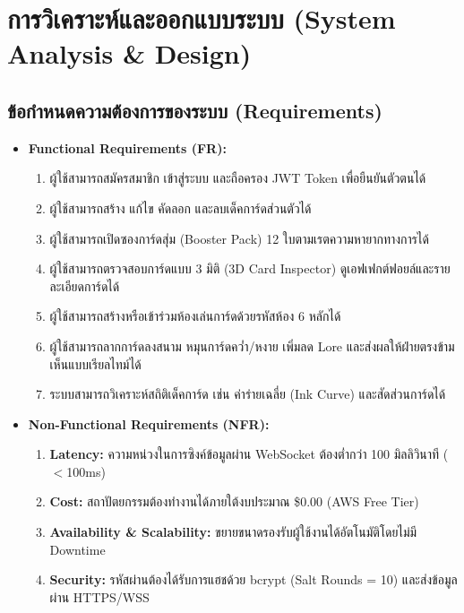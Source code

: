 \documentclass[12pt,a4paper]{article}
\begin{document}
\newpage

\section{การวิเคราะห์และออกแบบระบบ (System Analysis \& Design)}

\subsection{ข้อกำหนดความต้องการของระบบ (Requirements)}
\begin{itemize}[leftmargin=1.5em, itemsep=2pt]
  \item \textbf{Functional Requirements (FR):}
  \begin{enumerate}[leftmargin=1.5em, itemsep=1pt]
    \item ผู้ใช้สามารถสมัครสมาชิก เข้าสู่ระบบ และถือครอง JWT Token เพื่อยืนยันตัวตนได้
    \item ผู้ใช้สามารถสร้าง แก้ไข คัดลอก และลบเด็คการ์ดส่วนตัวได้
    \item ผู้ใช้สามารถเปิดซองการ์ดสุ่ม (Booster Pack) 12 ใบตามเรตความหายากทางการได้
    \item ผู้ใช้สามารถตรวจสอบการ์ดแบบ 3 มิติ (3D Card Inspector) ดูเอฟเฟกต์ฟอยล์และรายละเอียดการ์ดได้
    \item ผู้ใช้สามารถสร้างหรือเข้าร่วมห้องเล่นการ์ดด้วยรหัสห้อง 6 หลักได้
    \item ผู้ใช้สามารถลากการ์ดลงสนาม หมุนการ์ดคว่ำ/หงาย เพิ่มลด Lore และส่งผลให้ฝ่ายตรงข้ามเห็นแบบเรียลไทม์ได้
    \item ระบบสามารถวิเคราะห์สถิติเด็คการ์ด เช่น ค่าร่ายเฉลี่ย (Ink Curve) และสัดส่วนการ์ดได้
  \end{enumerate}
  \item \textbf{Non-Functional Requirements (NFR):}
  \begin{enumerate}[leftmargin=1.5em, itemsep=1pt]
    \item \textbf{Latency:} ความหน่วงในการซิงค์ข้อมูลผ่าน WebSocket ต้องต่ำกว่า 100 มิลลิวินาที ($<$100ms)
    \item \textbf{Cost:} สถาปัตยกรรมต้องทำงานได้ภายใต้งบประมาณ \$0.00 (AWS Free Tier)
    \item \textbf{Availability \& Scalability:} ขยายขนาดรองรับผู้ใช้งานได้อัตโนมัติโดยไม่มี Downtime
    \item \textbf{Security:} รหัสผ่านต้องได้รับการแฮชด้วย bcrypt (Salt Rounds = 10) และส่งข้อมูลผ่าน HTTPS/WSS
  \end{enumerate}
\end{itemize}
\end{document}
